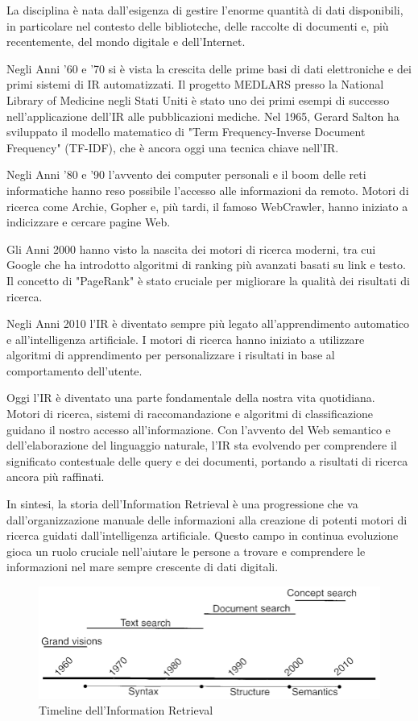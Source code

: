 La disciplina è nata dall'esigenza di gestire l'enorme quantità di dati disponibili, in particolare nel contesto delle biblioteche, delle raccolte di documenti e,
più recentemente, del mondo digitale e dell'Internet.

Negli Anni '60 e '70 si è vista la crescita delle prime basi di dati elettroniche e dei primi sistemi di IR automatizzati. Il progetto MEDLARS presso la National Library of Medicine negli Stati Uniti è stato uno dei primi esempi di successo nell'applicazione dell'IR alle pubblicazioni mediche. Nel 1965, Gerard Salton ha sviluppato il modello matematico di "Term Frequency-Inverse Document Frequency" (TF-IDF), che è ancora oggi una tecnica chiave nell'IR.

Negli Anni '80 e '90 l'avvento dei computer personali e il boom delle reti informatiche hanno reso possibile l'accesso alle informazioni da remoto. Motori di ricerca come Archie, Gopher e, più tardi, il famoso WebCrawler, hanno iniziato a indicizzare e cercare pagine Web.

Gli Anni 2000 hanno visto la nascita dei motori di ricerca moderni, tra cui Google che ha introdotto algoritmi di ranking più avanzati basati su link e testo. Il concetto di "PageRank" è stato cruciale per migliorare la qualità dei risultati di ricerca.

Negli Anni 2010 l'IR è diventato sempre più legato all'apprendimento automatico e all'intelligenza artificiale. I motori di ricerca hanno iniziato a utilizzare algoritmi di apprendimento per personalizzare i risultati in base al comportamento dell'utente.

Oggi l'IR è diventato una parte fondamentale della nostra vita quotidiana. Motori di ricerca, sistemi di raccomandazione e algoritmi di classificazione guidano il nostro accesso all'informazione. Con l'avvento del Web semantico e dell'elaborazione del linguaggio naturale, l'IR sta evolvendo per comprendere il significato contestuale delle query e dei documenti, portando a risultati di ricerca ancora più raffinati.

In sintesi, la storia dell'Information Retrieval è una progressione che va dall'organizzazione manuale delle informazioni alla creazione di potenti motori di ricerca guidati dall'intelligenza artificiale. Questo campo in continua evoluzione gioca un ruolo cruciale nell'aiutare le persone a trovare e comprendere le informazioni nel mare sempre crescente di dati digitali.

\begin{figure}
    \includegraphics[width=0.75\pdfpagewidth]{images/timelineir.png}
    \caption{Timeline dell'Information Retrieval}
\end{figure}